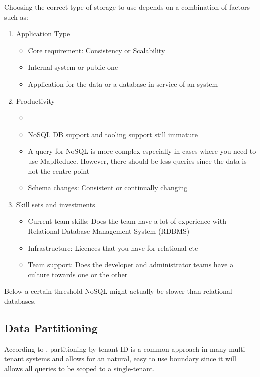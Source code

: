 Choosing the correct type of storage to use depends on a combination of factors such as:
 

\begin{enumerate}
\item Application Type
\begin{itemize}
    \item Core requirement: Consistency or Scalability
    \item Internal system or public one
    \item Application for the data or a database in service of an system
\end{itemize}
\item Productivity
\begin{itemize}
\item 
    \item NoSQL DB support and tooling support still immature
    \item A query for NoSQL is more complex especially in cases where you           need to use MapReduce. However, there should be less queries              since the data is not the centre point
    \item Schema changes: Consistent or continually changing
\end{itemize}
\item Skill sets and investments
\begin{itemize}
    \item Current team skills: Does the team have a lot of experience with           Relational Database Management System (RDBMS)
    \item Infrastructure: Licences that you have for relational etc
    \item Team support: Does the developer and administrator teams have a           culture towards one or the other
\end{itemize}
\end{enumerate}

Below a certain threshold NoSQL might actually be slower than relational databases.

\subsection{Data Partitioning}

According to \cite{Betts2012-ad}, partitioning by tenant ID is a common approach in many multi-tenant systems and allows for an natural, easy to use boundary since it will allows all queries to be scoped to a single-tenant.
 
